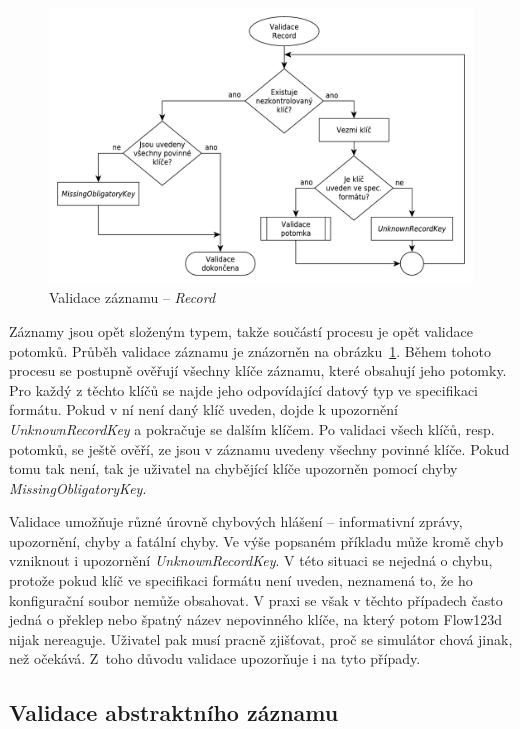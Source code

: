 \documentclass[FM,bw,DP]{tulthesis}
\begin{document}
\begin{figure}[h]
	\centering
    \includegraphics[width=\textwidth]{../img/validation_record.pdf}
    \caption{Validace záznamu -- \textit{Record}}
	\label{img:validation_record}
\end{figure}

Záznamy jsou opět složeným typem, takže součástí procesu je opět validace potomků. Průběh validace záznamu je znázorněn na obrázku~\ref{img:validation_record}. Během tohoto procesu se postupně ověřují všechny klíče záznamu, které obsahují jeho potomky. Pro každý z těchto klíčů se najde jeho odpovídající datový typ ve specifikaci formátu. Pokud v ní není daný klíč uveden, dojde k upozornění \textit{UnknownRecordKey} a pokračuje se dalším klíčem. Po validaci všech klíčů, resp. potomků, se ještě ověří, ze jsou v záznamu uvedeny všechny povinné klíče. Pokud tomu tak není, tak je uživatel na chybějící klíče upozorněn pomocí chyby \textit{MissingObligatoryKey}.

Validace umožňuje různé úrovně chybových hlášení -- informativní zprávy, upozornění, chyby a fatální chyby. Ve výše popsaném příkladu může kromě chyb vzniknout i upozornění \textit{UnknownRecordKey}. V této situaci se nejedná o chybu, protože pokud klíč ve specifikaci formátu není uveden, neznamená to, že ho konfigurační soubor nemůže obsahovat. V praxi se však v těchto případech často jedná o překlep nebo špatný název nepovinného klíče, na který potom Flow123d nijak nereaguje. Uživatel pak musí pracně zjišťovat, proč se simulátor chová jinak, než očekává. Z~toho důvodu validace upozorňuje i na tyto případy.

\subsection{Validace abstraktního záznamu}
\end{document}
